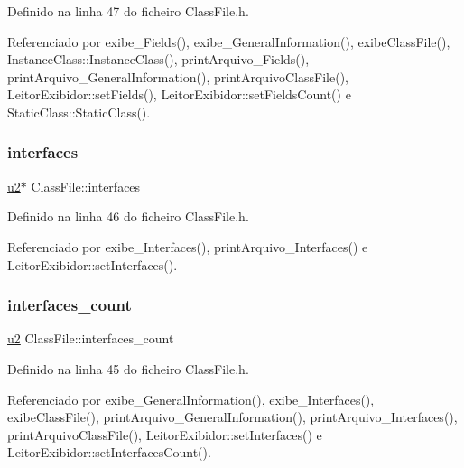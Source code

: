 Definido na linha 47 do ficheiro Class\+File.\+h.



Referenciado por exibe\+\_\+\+Fields(), exibe\+\_\+\+General\+Information(), exibe\+Class\+File(), Instance\+Class\+::\+Instance\+Class(), print\+Arquivo\+\_\+\+Fields(), print\+Arquivo\+\_\+\+General\+Information(), print\+Arquivo\+Class\+File(), Leitor\+Exibidor\+::set\+Fields(), Leitor\+Exibidor\+::set\+Fields\+Count() e Static\+Class\+::\+Static\+Class().

\mbox{\label{classClassFile_af599de97e062c98966470f1590496425}} 
\subsubsection{\texorpdfstring{interfaces}{interfaces}}
{\footnotesize\ttfamily \hyperlink{BasicTypes_8h_a732cde1300aafb73b0ea6c2558a7a54f}{u2}$\ast$ Class\+File\+::interfaces}



Definido na linha 46 do ficheiro Class\+File.\+h.



Referenciado por exibe\+\_\+\+Interfaces(), print\+Arquivo\+\_\+\+Interfaces() e Leitor\+Exibidor\+::set\+Interfaces().

\mbox{\label{classClassFile_a337fcb7da33d1b64631441115c7de305}} 
\subsubsection{\texorpdfstring{interfaces\+\_\+count}{interfaces\_count}}
{\footnotesize\ttfamily \hyperlink{BasicTypes_8h_a732cde1300aafb73b0ea6c2558a7a54f}{u2} Class\+File\+::interfaces\+\_\+count}



Definido na linha 45 do ficheiro Class\+File.\+h.



Referenciado por exibe\+\_\+\+General\+Information(), exibe\+\_\+\+Interfaces(), exibe\+Class\+File(), print\+Arquivo\+\_\+\+General\+Information(), print\+Arquivo\+\_\+\+Interfaces(), print\+Arquivo\+Class\+File(), Leitor\+Exibidor\+::set\+Interfaces() e Leitor\+Exibidor\+::set\+Interfaces\+Count().

